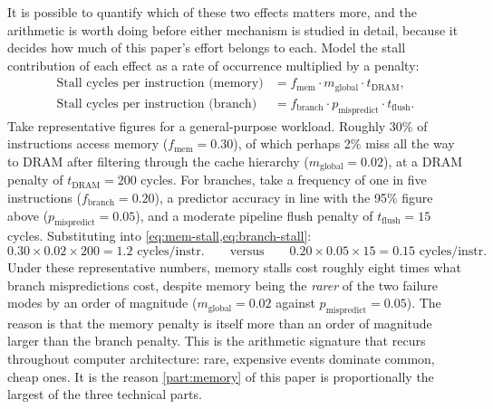 \documentclass[12pt,a4paper]{report}
\begin{document}
It is possible to quantify which of these two effects matters more, and
the arithmetic is worth doing before either mechanism is studied in
detail, because it decides how much of this paper's effort belongs to
each. Model the stall contribution of each effect as a rate of
occurrence multiplied by a penalty:
\begin{align}
\text{Stall cycles per instruction (memory)} &= f_{\text{mem}} \cdot m_{\text{global}} \cdot t_{\text{DRAM}}, \label{eq:mem-stall} \\
\text{Stall cycles per instruction (branch)} &= f_{\text{branch}} \cdot p_{\text{mispredict}} \cdot t_{\text{flush}}. \label{eq:branch-stall}
\end{align}
Take representative figures for a general-purpose workload. Roughly 30\%
of instructions access memory ($f_{\text{mem}} = 0.30$), of which
perhaps 2\% miss all the way to DRAM after filtering through the cache
hierarchy ($m_{\text{global}} = 0.02$), at a DRAM penalty of
$t_{\text{DRAM}} = 200$ cycles. For branches, take a frequency of one in
five instructions ($f_{\text{branch}} = 0.20$), a predictor accuracy in
line with the 95\% figure above ($p_{\text{mispredict}} = 0.05$), and a
moderate pipeline flush penalty of $t_{\text{flush}} = 15$ cycles.
Substituting into \cref{eq:mem-stall,eq:branch-stall}:
\[
0.30 \times 0.02 \times 200 = 1.2 \text{ cycles/instr.}
\qquad\text{versus}\qquad
0.20 \times 0.05 \times 15 = 0.15 \text{ cycles/instr.}
\]
Under these representative numbers, memory stalls cost roughly eight
times what branch mispredictions cost, despite memory being the
\emph{rarer} of the two failure modes by an order of magnitude
($m_{\text{global}} = 0.02$ against $p_{\text{mispredict}} = 0.05$). The
reason is that the memory penalty is itself more than an order of
magnitude larger than the branch penalty. This is the arithmetic
signature that recurs throughout computer architecture: rare, expensive
events dominate common, cheap ones. It is the reason \cref{part:memory}
of this paper is proportionally the largest of the three technical
parts.
\end{document}

